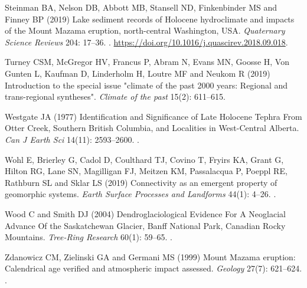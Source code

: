 \documentclass[Royal,times,doublespace,sageh]{sagej}
\begin{document}
\begin{thebibliography}{69}
{
Steinman BA, Nelson DB, Abbott MB, Stansell ND, Finkenbinder MS and Finney BP
  (2019) {Lake sediment records of Holocene hydroclimate and impacts of the
  Mount Mazama eruption, north-central Washington, USA}.
\newblock \emph{Quaternary Science Reviews} 204: 17--36.
\newblock {}.
\newblock \urlprefix\url{https://doi.org/10.1016/j.quascirev.2018.09.018}.

Turney CSM, McGregor HV, Francus P, Abram N, Evans MN, Goosse H, {Von Gunten}
  L, Kaufman D, Linderholm H, Loutre MF and Neukom R (2019) {Introduction to
  the special issue "climate of the past 2000 years: Regional and
  trans-regional syntheses"}.
\newblock \emph{Climate of the past} 15(2): 611--615.

Westgate JA (1977) {Identification and Significance of Late Holocene Tephra
  From Otter Creek, Southern British Columbia, and Localities in West-Central
  Alberta.}
\newblock \emph{Can J Earth Sci} 14(11): 2593--2600.
\newblock {}.

Wohl E, Brierley G, Cadol D, Coulthard TJ, Covino T, Fryirs KA, Grant G, Hilton
  RG, Lane SN, Magilligan FJ, Meitzen KM, Passalacqua P, Poeppl RE, Rathburn SL
  and Sklar LS (2019) {Connectivity as an emergent property of geomorphic
  systems}.
\newblock \emph{Earth Surface Processes and Landforms} 44(1): 4--26.
\newblock {}.

Wood C and Smith DJ (2004) {Dendroglaciological Evidence For A Neoglacial
  Advance Of the Saskatchewan Glacier, Banff National Park, Canadian Rocky
  Mountains}.
\newblock \emph{Tree-Ring Research} 60(1): 59--65.
\newblock {}.

Zdanowicz CM, Zielinski GA and Germani MS (1999) {Mount Mazama eruption:
  Calendrical age verified and atmospheric impact assessed}.
\newblock \emph{Geology} 27(7): 621--624.
\newblock {}.

}
\end{thebibliography}
\end{document}

